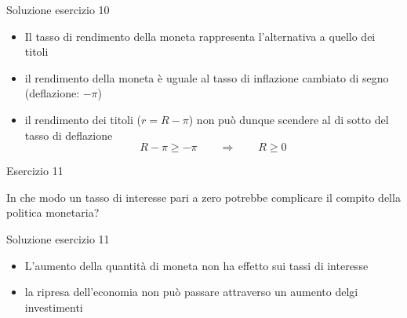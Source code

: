 \begin{frame}{Soluzione esercizio 10}
\protect\hypertarget{soluzione-esercizio-10}{}

\begin{itemize}
\item
  Il tasso di rendimento della moneta rappresenta l'alternativa a quello
  dei titoli
\item
  il rendimento della moneta è uguale al tasso di inflazione cambiato di
  segno (deflazione: \(-\pi\))
\item
  il rendimento dei titoli (\(r=R-\pi\)) non può dunque scendere al di
  sotto del tasso di deflazione
  \[R-\pi\ge -\pi \qquad \Rightarrow \qquad R\ge 0\]
\end{itemize}

\end{frame}

\fi

\begin{frame}{Esercizio 11}
\protect\hypertarget{esercizio-11}{}

In che modo un tasso di interesse pari a zero potrebbe complicare il
compito della politica monetaria?

\end{frame}

\ifshowsolution

\begin{frame}{Soluzione esercizio 11}
\protect\hypertarget{soluzione-esercizio-11}{}

\begin{itemize}
\item
  L'aumento della quantità di moneta non ha effetto sui tassi di
  interesse
\item
  la ripresa dell'economia non può passare attraverso un aumento delgi
  investimenti
\end{itemize}

\end{frame}
\fi

